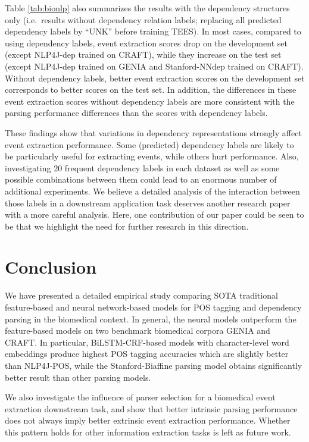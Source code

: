 \documentclass[twocolumn,hyperref]{bmcart}\pdfoutput=1
\begin{document}
   
Table  \ref{tab:bionlp}  also summarizes the results with the dependency structures only (i.e.\ results without dependency relation labels; replacing all predicted dependency labels by  ``UNK''  before training TEES). In most cases, compared to using dependency labels, event extraction scores drop on the development set (except NLP4J-dep trained on CRAFT), while they increase on the test set (except NLP4J-dep trained on GENIA and Stanford-NNdep trained on CRAFT). Without dependency labels,  better event extraction scores on the development set corresponds to better scores on the test set. In addition, the differences in these event extraction scores without dependency labels are more consistent with the parsing performance differences than the scores with dependency labels. 

These findings show that variations in dependency  representations strongly affect event extraction performance.  Some (predicted) dependency labels are likely to be particularly useful for extracting events, while others hurt performance. Also, investigating 20 frequent dependency labels in each dataset as well as some possible combinations between them could lead to an enormous number of additional experiments. We believe a detailed analysis of the interaction between those  labels in a downstream application task deserves another research paper with a more careful analysis. Here, one contribution of our paper could be seen to be that we highlight the need for further research  in this direction.
 
\section*{Conclusion}

We have presented a detailed empirical study comparing SOTA traditional feature-based and neural network-based models for POS tagging and dependency parsing in the biomedical context.  
In general, the neural models outperform the feature-based models on two benchmark biomedical corpora GENIA and CRAFT. In particular,  BiLSTM-CRF-based models with character-level word embeddings produce highest POS tagging accuracies  which are slightly better than NLP4J-POS, while the   Stanford-Biaffine parsing model obtains significantly better  result than other parsing models.    

We also investigate the influence of parser selection for a biomedical event extraction downstream task,  and show that better intrinsic parsing performance does not always imply better extrinsic event extraction performance. Whether this pattern holds for other  information extraction tasks is left as future work.  
\end{document}
